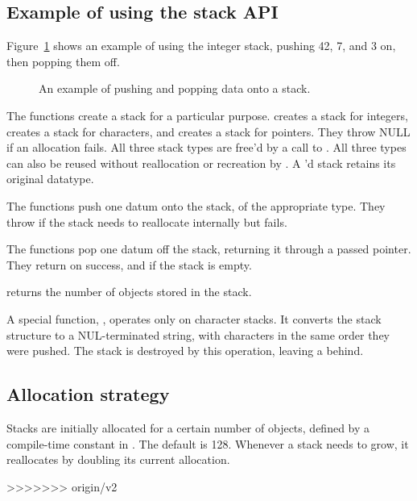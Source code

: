 \subsection{Example of using the stack API}
   
Figure~\ref{fig:stack_example} shows an example of using the integer
stack, pushing 42, 7, and 3 on, then popping them off.

\begin{figure}

\caption{An example of pushing and popping data onto a stack.}
\label{fig:stack_example}
\end{figure}

The  functions create a stack for a particular
purpose.  creates a stack for integers,
 creates a stack for characters, and
 creates a stack for pointers.  They
throw NULL if an allocation fails.  All three stack types are free'd
by a call to . All three types can also
be reused without reallocation or recreation by
. A 'd stack retains its
original datatype.

The  functions push one datum onto the stack, of the
appropriate type. They throw  if the stack needs to
reallocate internally but fails.

The  functions pop one datum off the stack, returning it
through a passed pointer. They return  on success, and
 if the stack is empty.

 returns the number of objects stored
in the stack. 

A special function, , operates
only on character stacks. It converts the stack structure to a
NUL-terminated string, with characters in the same order they were
pushed. The stack is destroyed by this operation, leaving a
 behind.

\subsection{Allocation strategy}

Stacks are initially allocated for a certain number of objects,
defined by a compile-time constant  in
. The default is 128. Whenever a stack needs to grow,
it reallocates by doubling its current allocation.


>>>>>>> origin/v2
